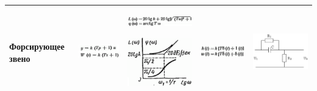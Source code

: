 \documentclass[14pt,a4paper,report]{report}
\begin{document}
\begin{table}[h!]
\begin{tabular}{ | m{3cm} | m{3.5cm} | m{4.5cm} | m{2.5cm} | m{2.5cm} }
		Форсирующее звено
		&
		\begin{minipage}{.3\textwidth}
			\includegraphics[scale = 0.45]{images/5_2.png}
		\end{minipage}
		&
		\begin{minipage}{.3\textwidth}
			\includegraphics[scale = 0.35]{images/5_3_f.png}
		\end{minipage}
		\begin{minipage}{.3\textwidth}
			\includegraphics[scale = 0.5]{images/5_3.png}
		\end{minipage}
		&
		\begin{minipage}{.3\textwidth}
			\includegraphics[scale = 0.32]{images/5_4.png}
		\end{minipage}
		&
		\begin{minipage}{.3\textwidth}
			\includegraphics[scale = 0.22]{images/5_5.png}
		\end{minipage} \\ \hline
		

\end{tabular}
\end{table}
\end{document}
